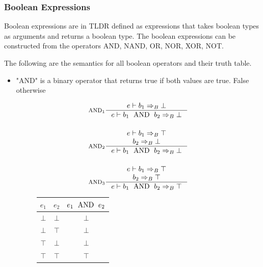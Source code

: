 \subsubsection{Boolean Expressions}
Boolean expressions are in TLDR defined as expressions that takes boolean types as arguments and returns a boolean type. The boolean expressions can be constructed from the operators AND, NAND, OR, NOR, XOR, NOT.

The following are the semantics for all boolean operators and their truth table.

\begin{itemize}
\item "AND" is a binary operator that returns true if both values are true. False otherwise
\begin{figure}[H]
\centering
  \begin{minipage}[c]{0.45\linewidth}
	  \centering
    \begin{align*}
    &\inference[$\text{AND}_1$]{e \vdash b_1 \Rightarrow_B \bot}
                               {e \vdash b_1 \Tand b_2 \Rightarrow_B \bot}
    \\\\
    &\inference[$\text{AND}_2$]{e \vdash b_1 \Rightarrow_B \top \\ b_2 \Rightarrow_B \bot}
                               {e \vdash b_1 \Tand b_2 \Rightarrow_B \bot}
    \\\\
    &\inference[$\text{AND}_3$]{e \vdash b_1 \Rightarrow_B \top \\ b_2 \Rightarrow_B \top}
                               {e \vdash b_1 \Tand b_2 \Rightarrow_B \top}
    \end{align*}
  \end{minipage}
	\quad
	\begin{minipage}[c]{0.45\linewidth}
	  \centering
    \begin{tabular}{ | c | c | c | }
      \hline
      $e_1$ & $e_2$ & $e_1 \text{\; AND \;} e_2$ \\\hline
      $\bot$ & $\bot$ & $\bot$ \\\hline
      $\bot$ & $\top$ & $\bot$ \\\hline
      $\top$ & $\bot$ & $\bot$ \\\hline
      $\top$ & $\top$ & $\top$ \\\hline
    \end{tabular}
  \end{minipage}
\end{figure}


\end{itemize}
